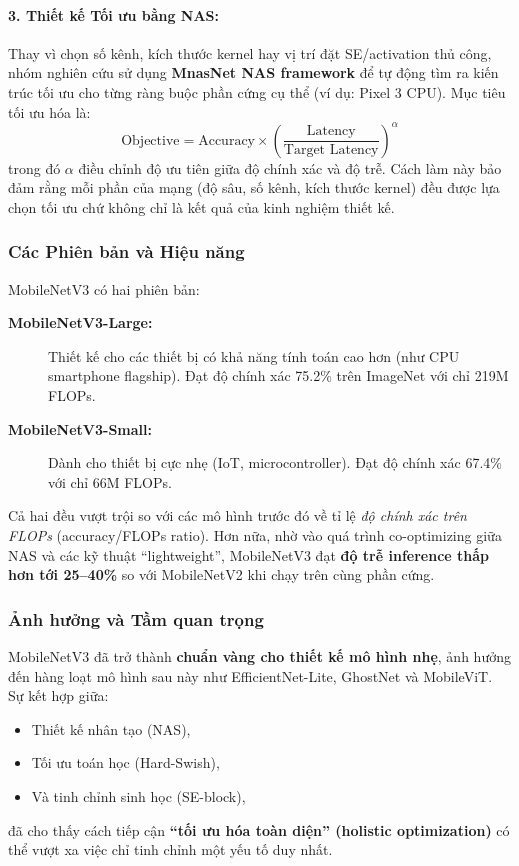 \paragraph{3. Thiết kế Tối ưu bằng NAS:}
Thay vì chọn số kênh, kích thước kernel hay vị trí đặt SE/activation thủ công, nhóm nghiên cứu sử dụng \textbf{MnasNet NAS framework} để tự động tìm ra kiến trúc tối ưu cho từng ràng buộc phần cứng cụ thể (ví dụ: Pixel 3 CPU).  
Mục tiêu tối ưu hóa là:
\begin{equation}
	\text{Objective} = \text{Accuracy} \times \left(\frac{\text{Latency}}{\text{Target Latency}}\right)^{\alpha}
\end{equation}
trong đó $\alpha$ điều chỉnh độ ưu tiên giữa độ chính xác và độ trễ.  
Cách làm này bảo đảm rằng mỗi phần của mạng (độ sâu, số kênh, kích thước kernel) đều được lựa chọn tối ưu chứ không chỉ là kết quả của kinh nghiệm thiết kế.

\subsubsection{Các Phiên bản và Hiệu năng}
MobileNetV3 có hai phiên bản:
\begin{description}
	\item[\textbf{MobileNetV3-Large:}] Thiết kế cho các thiết bị có khả năng tính toán cao hơn (như CPU smartphone flagship).  
	Đạt độ chính xác 75.2\% trên ImageNet với chỉ 219M FLOPs.
	\item[\textbf{MobileNetV3-Small:}] Dành cho thiết bị cực nhẹ (IoT, microcontroller).  
	Đạt độ chính xác 67.4\% với chỉ 66M FLOPs.
\end{description}

Cả hai đều vượt trội so với các mô hình trước đó về tỉ lệ \textit{độ chính xác trên FLOPs} (accuracy/FLOPs ratio).  
Hơn nữa, nhờ vào quá trình co-optimizing giữa NAS và các kỹ thuật “lightweight”, MobileNetV3 đạt \textbf{độ trễ inference thấp hơn tới 25–40\%} so với MobileNetV2 khi chạy trên cùng phần cứng.

\subsubsection{Ảnh hưởng và Tầm quan trọng}
MobileNetV3 đã trở thành \textbf{chuẩn vàng cho thiết kế mô hình nhẹ}, ảnh hưởng đến hàng loạt mô hình sau này như EfficientNet-Lite, GhostNet và MobileViT.  
Sự kết hợp giữa:
\begin{itemize}
	\item Thiết kế nhân tạo (NAS),
	\item Tối ưu toán học (Hard-Swish),
	\item Và tinh chỉnh sinh học (SE-block),
\end{itemize}
đã cho thấy cách tiếp cận \textbf{“tối ưu hóa toàn diện” (holistic optimization)} có thể vượt xa việc chỉ tinh chỉnh một yếu tố duy nhất.

